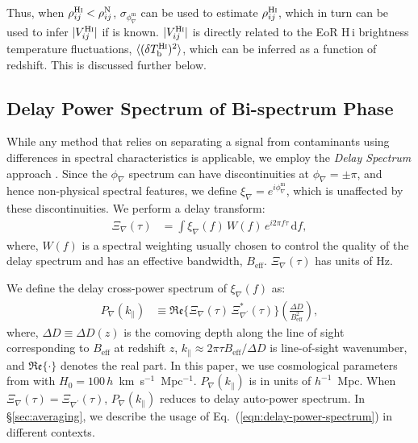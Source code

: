 \documentclass[
reprint,
superscriptaddress,
amsmath,
amssymb,
aps,
prd
]{revtex4-1}
\begin{document}
Thus, when $\rho_{ij}^\textrm{H{\sc i}} < \rho_{ij}^\textrm{N}$, $\sigma_{\phi_\nabla^\textrm{m}}$ can be used to estimate $\rho_{ij}^\textrm{H{\sc i}}$, which in turn can be used to infer $|V_{ij}^\textrm{H{\sc i}}|$ if  is known. $|V_{ij}^\textrm{H{\sc i}}|$ is directly related to the EoR H\,{\sc i} brightness temperature fluctuations, $\langle(\delta T_\textrm{b}^\textrm{H{\sc i}})^2\rangle$, which can be inferred as a function of  redshift. This is discussed further below.

\subsection{Delay Power Spectrum of Bi-spectrum Phase}\label{sec:cp-FG-wedge}

While any method that relies on separating a signal from contaminants using differences in spectral characteristics is applicable, we employ the {\it Delay Spectrum} approach \cite{par12a,par12b}. Since the $\phi_\nabla$ spectrum can have discontinuities at $\phi_\nabla=\pm\pi$, and hence non-physical spectral features, we define $\xi_\nabla = e^{i\phi_\nabla^\textrm{m}}$, which is unaffected by these discontinuities. We perform a delay transform:
\begin{align}\label{eqn:cpdspec}
  \Xi_\nabla(\tau) &= \int \xi_\nabla(f)\,W(f)\,e^{i2\pi f\tau}\,\mathrm{d}f,
\end{align}
where, $W(f)$ is a spectral weighting usually chosen to control the quality of the delay spectrum \citep{thy13,thy16} and has an effective bandwidth, $B_\textrm{eff}$. $\Xi_\nabla(\tau)$ has units of Hz. 

We define the delay cross-power spectrum of $\xi_\nabla(f)$ as:
\begin{align}
  P_\nabla(k_\parallel) &\equiv \mathfrak{Re}\bigg\{\Xi_\nabla(\tau)\,\Xi_{\nabla^\prime}^*(\tau)\bigg\} \left(\frac{\Delta D}{B_\textrm{eff}^2}\right), \label{eqn:delay-power-spectrum}
\end{align}
where, $\Delta D\equiv \Delta D(z)$ is the comoving depth along the line of sight corresponding to $B_\textrm{eff}$ at redshift $z$, $k_\parallel\approx 2\pi\tau B_\textrm{eff}/\Delta D$ is line-of-sight wavenumber, and $\mathfrak{Re}\{\cdot\}$ denotes the real part. In this paper, we use cosmological parameters from \cite{planck15xiii} with $H_0=100\,h$~km~s$^{-1}$~Mpc$^{-1}$. $P_\nabla(k_\parallel)$ is in units of $h^{-1}$~Mpc. When $\Xi_\nabla(\tau)=\Xi_{\nabla^\prime}(\tau)$, $P_\nabla(k_\parallel)$ reduces to delay auto-power spectrum. In \S\ref{sec:averaging}, we describe the usage of Eq.~(\ref{eqn:delay-power-spectrum}) in different contexts. 
\end{document}

